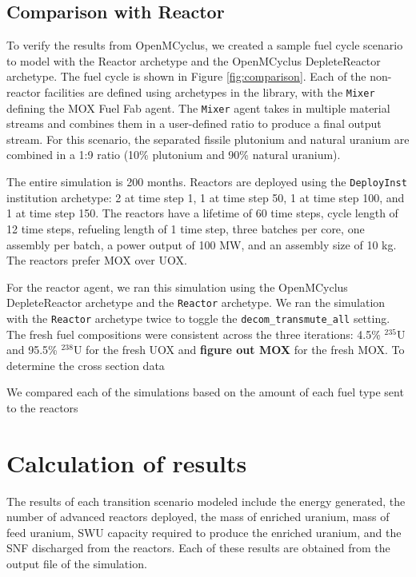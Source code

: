 \subsection{Comparison with \Cycamore Reactor}
To verify the results from OpenMCyclus, we created a sample fuel cycle 
scenario to model with the \Cycamore Reactor archetype and the 
OpenMCyclus DepleteReactor archetype. The fuel cycle is shown in Figure 
\ref{fig:comparison}. Each of the non-reactor facilities are defined 
using archetypes in the \Cycamore library, with the \Cycamore \texttt{Mixer}
defining the MOX Fuel Fab agent. The \texttt{Mixer} agent takes in multiple 
material streams and combines them in a user-defined ratio to produce 
a final output stream. For this scenario, the separated fissile plutonium 
and natural uranium are combined in a 1:9 ratio (10\% plutonium and 90\% 
natural uranium). 



The entire simulation is 200 months. Reactors are deployed using the 
\Cycamore \texttt{DeployInst} institution archetype: 2 at time step 1, 1 at time step 
50, 1 at time step 100, and 1 at time step 150. The reactors have a lifetime 
of 60 time steps, cycle length of 12 time steps, refueling length of 1 
time step, three batches per core, one assembly per batch, a power output of 
100 MW, and an assembly size of 10 kg. The reactors prefer MOX over UOX. 
 
For the reactor agent, we ran this simulation using the OpenMCyclus 
DepleteReactor archetype and the \Cycamore \texttt{Reactor} archetype. We ran the 
simulation with the \Cycamore \texttt{Reactor} archetype twice to toggle the 
\texttt{decom\_transmute\_all} setting. The fresh fuel compositions were consistent 
across the three iterations: 4.5\% $^{235}$U and 95.5\% $^{238}$U for the 
fresh UOX and \textbf{figure out MOX} for the fresh MOX. To determine the cross 
section data 

We compared each of the simulations 
based on the amount of each fuel type sent to the reactors

\section{Calculation of results} \label{sec:results_calc}
The results of each transition scenario modeled include the energy generated, 
the number of advanced reactors deployed, the mass of enriched uranium, 
mass of feed uranium, \gls{SWU} capacity required to produce the enriched 
uranium, and the \gls{SNF} discharged from the reactors. Each of these results 
are obtained from the \Cyclus output file of the simulation. 

